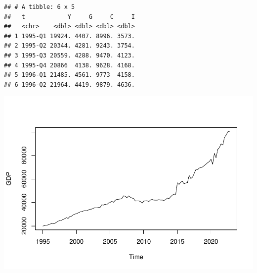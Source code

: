 \documentclass[
]{article}
\newenvironment{Shaded}{\begin{snugshade}}{\end{snugshade}}
\newcommand{\AttributeTok}[1]{\textcolor[rgb]{0.77,0.63,0.00}{#1}}
\newcommand{\DecValTok}[1]{\textcolor[rgb]{0.00,0.00,0.81}{#1}}
\newcommand{\FloatTok}[1]{\textcolor[rgb]{0.00,0.00,0.81}{#1}}
\newcommand{\FunctionTok}[1]{\textcolor[rgb]{0.00,0.00,0.00}{#1}}
\newcommand{\NormalTok}[1]{#1}
\newcommand{\OtherTok}[1]{\textcolor[rgb]{0.56,0.35,0.01}{#1}}
\newcommand{\SpecialCharTok}[1]{\textcolor[rgb]{0.00,0.00,0.00}{#1}}
\begin{document}
\begin{verbatim}
## # A tibble: 6 x 5
##   t            Y     G     C     I
##   <chr>    <dbl> <dbl> <dbl> <dbl>
## 1 1995-Q1 19924. 4407. 8996. 3573.
## 2 1995-Q2 20344. 4281. 9243. 3754.
## 3 1995-Q3 20559. 4288. 9470. 4123.
## 4 1995-Q4 20866  4138. 9628. 4168.
## 5 1996-Q1 21485. 4561. 9773  4158.
## 6 1996-Q2 21964. 4419. 9879. 4636.
\end{verbatim}

\begin{Shaded}
\end{Shaded}

\includegraphics{AdvMacro2_Assignment1_files/figure-latex/unnamed-chunk-2-1.pdf}
\end{document}
